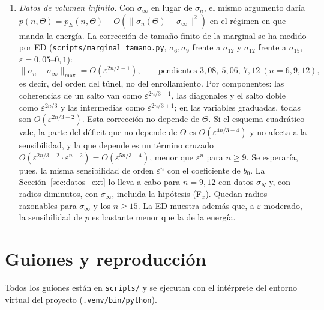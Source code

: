 \documentclass[11pt,a4paper]{article}
\theoremstyle{definition}
\theoremstyle{remark}
\newcommand{\eps}{\varepsilon}
\newcommand{\pE}{p_{E}}
\newcommand{\scr}[1]{\texttt{scripts/#1}}
\begin{document}
\begin{enumerate}
  $\approx0{,}3$ (Sección~\ref{sec:limites}), así que el dominio de analiticidad no es el obstáculo: lo es la
  cota de Bauer--Fike sobre él. Un dominio de radio $\eps_a\sim0{,}1$ con cotas explícitas (por ejemplo, un
  contorno de Kato en el plano complejo de $\eps$ certificado numéricamente en cada sector de momento)
  bastaría para el factor que falta en $n=9$.
\item \emph{Datos de volumen infinito.} Con $\sigma_\infty$ en lugar de $\sigma_n$, el mismo argumento
  daría $p(n,\Theta)=\pE(n,\Theta)-O(\|\sigma_n(\Theta)-\sigma_\infty\|^2)$ en el régimen en que manda la
  energía. La corrección de tamaño finito de la marginal se ha medido por ED (\scr{marginal\_tamano.py},
  $\sigma_6,\sigma_9$ frente a $\sigma_{12}$ y $\sigma_{12}$ frente a $\sigma_{15}$, $\eps=0{,}05$--$0{,}1$):
  \[
    \|\sigma_n-\sigma_\infty\|_{\max}=O(\eps^{2n/3-1}),\qquad\text{pendientes }3{,}08,\ 5{,}06,\ 7{,}12\ (n=6,9,12),
  \]
  es decir, del orden del túnel, no del enrollamiento. Por componentes: las coherencias de un salto van como
  $\eps^{2n/3-1}$, las diagonales y el salto doble como $\eps^{2n/3}$ y las intermedias como $\eps^{2n/3+1}$; en
  las variables graduadas, todas son $O(\eps^{2n/3-2})$. Esta corrección no depende de $\Theta$. Si el
  esquema cuadrático vale, la parte del déficit que no depende de $\Theta$ es $O(\eps^{4n/3-4})$ y no afecta a
  la sensibilidad, y la que depende es un término cruzado $O(\eps^{2n/3-2}\cdot\eps^{n-2})=O(\eps^{5n/3-4})$,
  menor que $\eps^n$ para $n\ge9$. Se esperaría, pues, la misma sensibilidad de orden $\eps^n$ con el
  coeficiente de $b_0$. La Sección~\ref{sec:datos_ext} lo lleva a cabo para $n=9,12$ con datos $\sigma_N$ y, con
  radios diminutos, con $\sigma_\infty$, incluida la hipótesis (F$_x$). Quedan radios razonables para
  $\sigma_\infty$ y los $n\ge15$. La ED muestra además que, a $\eps$ moderado, la sensibilidad de $p$ es
  bastante menor que la de la energía.
\end{enumerate}

\appendix
\section{Guiones y reproducción}\label{sec:guiones}

Todos los guiones están en \texttt{scripts/} y se ejecutan con el intérprete del entorno virtual del
proyecto (\texttt{.venv/bin/python}).
\end{document}
